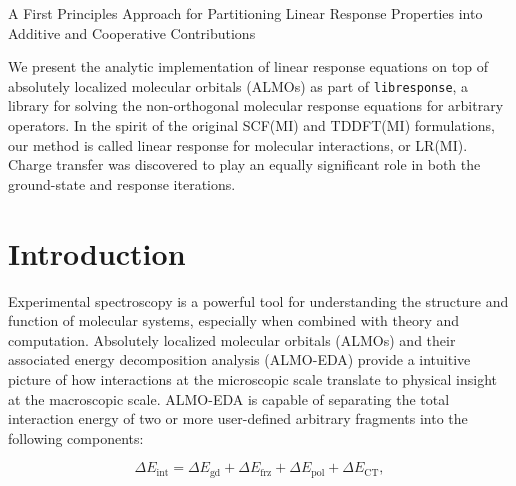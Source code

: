 \newcommand{\arlidimer}{\ce{Ar\bond{....}Li+}}

\newcommand{\aud}{\si{\bohr\cubed}}
\newcommand{\geomdeftsvp}{\SI{2.4106}{\angstrom}}
\newcommand{\geomdeftsvpd}{\SI{2.4297}{\angstrom}}

\newcommand{\pdalton}{\textsc{Dalton}}
\newcommand{\libresponse}{\texttt{libresponse}}
\newcommand{\psif}{\textsc{Psi4}}
\newcommand{\qchem}{\textsc{Q-Chem}}
\newcommand{\response}{\textsc{Response}}
\newcommand{\op}[1]{\ensuremath{\hat{#1}}}
\newcommand{\mat}[1]{\ensuremath{\mathbf{#1}}}
\newcommand{\Order}[1]{\ensuremath{\mathcal{O}\left(#1\right)}}
\newcommand{\tr}[1]{\ensuremath{{\mathrm{Tr}}\left\{#1\right\}}}
\newcommand{\eq}[1]{eq.~(\ref{#1})}
\let\citenum\cite
\newcommand{\citen}[1]{ref.~\citenum{#1}}
\newcommand{\lr}[2]{\braket{\braket{\op{#1}; \op{#2}}}}
\newcommand{\lrs}[4]{\braket{\braket{\op{#1}_{#2}; \op{#3}_{#4}}}}

A First Principles Approach for Partitioning Linear Response Properties into Additive and Cooperative Contributions

We present the analytic implementation of linear response equations on top of absolutely localized molecular orbitals (ALMOs) as part of \libresponse{}, a library for solving the non-orthogonal molecular response equations for arbitrary operators. In the spirit of the original SCF(MI) and TDDFT(MI) formulations, our method is called linear response for molecular interactions, or LR(MI). Charge transfer was discovered to play an equally significant role in both the ground-state and response iterations.

\section{Introduction}
\label{sec:introduction}

Experimental spectroscopy is a powerful tool for understanding the structure and function of molecular systems, especially when combined with theory and computation\cite{AUTSCHBACH200383,NEESE2009526,doi:10.1021/cr2002239}. Absolutely localized molecular orbitals (ALMOs)\cite{Khaliullin2006} and their associated energy decomposition analysis (ALMO-EDA)\cite{Khaliullin2007} provide a intuitive picture of how interactions at the microscopic scale translate to physical insight at the macroscopic scale. ALMO-EDA is capable of separating the total interaction energy of two or more user-defined arbitrary fragments into the following components:

\begin{equation}
  \label{eq:almo-eda}
  \Delta E_{\text{int}} = \Delta E_{\text{gd}} + \Delta E_{\text{frz}} + \Delta E_{\text{pol}} + \Delta E_{\text{CT}},
\end{equation}

